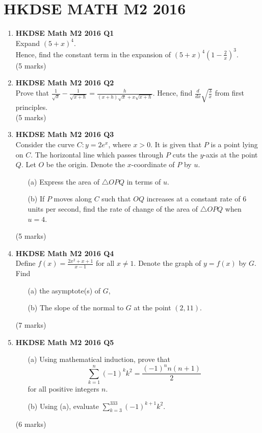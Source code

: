 \documentclass{report}
\begin{document}
\chapter{HKDSE MATH M2 2016}
\begin{enumerate}
	\item \textbf{HKDSE Math M2 2016 Q1}\\
	Expand $(5+x)^4$. \\Hence, find the constant term in the expansion of $(5+x)^4\left(1-\displaystyle\frac{2}{x}\right)^3$. \\(5 marks)

	\item \textbf{HKDSE Math M2 2016 Q2}\\
	Prove that $\displaystyle\frac{1}{\sqrt{x}} - \frac{1}{\sqrt{x+h}} = \frac{h}{(x+h)\sqrt{x} + x\sqrt{x+h}}$. Hence, find $\displaystyle \frac{d}{dx} \sqrt{\displaystyle\frac{3}{x}}$ from first principles. \\(5 marks)

	\item \textbf{HKDSE Math M2 2016 Q3}\\
	Consider the curve $C : y = 2e^x$, where $x>0$. It is given that $P$ is a point lying on $C$. The horizontal line which passes through $P$ cuts the $y$-axis at the point $Q$. Let $O$ be the origin. Denote the $x$-coordinate of $P$ by $u$. 
	\begin{enumerate}
		\item [(a)]Express the area of $\triangle OPQ$ in terms of $u$.
		\item [(b)]If $P$ moves along $C$ such that $OQ$ increases at a constant rate of $6$ units per second, find the rate of change of the area of $\triangle OPQ$ when $u=4$.
	\end{enumerate}
	(5 marks)

	\item \textbf{HKDSE Math M2 2016 Q4}\\
	Define $f(x) = \displaystyle\frac{2x^2 + x + 1}{x - 1}$ for all $x \neq 1$. Denote the graph of $y = f(x)$ by $G$. Find 
	\begin{enumerate}
		\item [(a)]the asymptote(s) of $G$,
		\item [(b)]The slope of the normal to $G$ at the point $(2,11)$.
	\end{enumerate}
	(7 marks)

	\item \textbf{HKDSE Math M2 2016 Q5}
	\begin{enumerate}
		\item [(a)]Using mathematical induction, prove that $$\displaystyle\sum_{k=1}^{n} (-1)^k k^2 = \frac{(-1)^n n(n+1)}{2}$$ for all positive integers $n$. 
		\item [(b)]Using (a), evaluate $\displaystyle\sum_{k=3}^{333} (-1)^{k+1} k^2$.
	\end{enumerate}
	(6 marks)


\end{enumerate}
\end{document}
